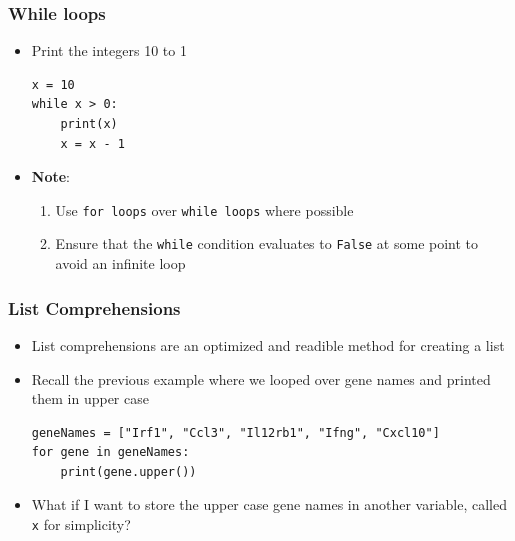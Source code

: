 \documentclass[pdf]{beamer}
\begin{document}
\begin{frame}[fragile]
\frametitle{While loops}

\begin{itemize}

\item Print the integers 10 to 1
\begin{lstlisting}[style=python]
x = 10
while x > 0:
    print(x)
    x = x - 1
\end{lstlisting}

\item \textbf{Note}: 
\begin{enumerate}\addtolength{\itemsep}{0.5\baselineskip}
\item Use \texttt{for loops} over \texttt{while loops} where possible
\item Ensure that the \texttt{while} condition evaluates to 
\texttt{False} at some point to avoid an infinite loop
\end{enumerate}

\end{itemize}

\end{frame}

\begin{frame}[fragile]
\frametitle{List Comprehensions}

\begin{itemize}\addtolength{\itemsep}{0.5\baselineskip}

\item<1-> List comprehensions are an optimized and readible method for creating a list

\item<2-> Recall the previous example where we looped over gene names and printed them in upper
case
\begin{lstlisting}[style=python]
geneNames = ["Irf1", "Ccl3", "Il12rb1", "Ifng", "Cxcl10"]
for gene in geneNames:
    print(gene.upper())
\end{lstlisting}

\item<3-> What if I want to store the upper case gene names in another variable, 
called \texttt{x} for simplicity?

\end{itemize}

\end{frame}
\end{document}
